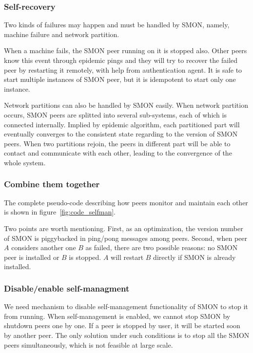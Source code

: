 \subsubsection*{Self-recovery}

Two kinds of failures may happen and must be handled by
SMON, namely, machine failure and network partition.

When a machine fails, the SMON peer running on it is stopped
also. Other peers know this event through epidemic pings and
they will try to recover the failed peer by restarting it
remotely, with help from authentication agent. It is safe to
start multiple instances of SMON peer, but it is idempotent
to start only one instance.

Network partitions can also be handled by SMON easily. When
network partition occurs, SMON peers are splitted into
several sub-systems, each of which is connected internally.
Implied by epidemic algorithm, each partitioned part will
eventually converges to the consistent state regarding to
the version of SMON peers. When two partitions rejoin, the
peers in different part will be able to contact and
communicate with each other, leading to the convergence of
the whole system.

\subsubsection*{Combine them together}

The complete pseudo-code describing how peers monitor and
maintain each other is shown in
figure~\ref{fig:code_selfman}. 

Two points are worth mentioning. First, as an optimization,
the version number of SMON is piggybacked in ping/pong
messages among peers.  Second, when peer $A$ considers
another one $B$ as failed, there are two possible reasons:
no SMON peer is installed or $B$ is stopped. $A$ will
restart $B$ directly if SMON is already installed.

\subsubsection*{Disable/enable self-managment}
\label{subsec:livetag}

We need mechanism to disable self-management functionality
of SMON to stop it from running. When self-management is
enabled, we cannot stop SMON by shutdown peers one by one.
If a peer is stopped by user, it will be started soon by
another peer. The only solution under such conditions is to
stop all the SMON peers simultaneously, which is not
feasible at large scale.

